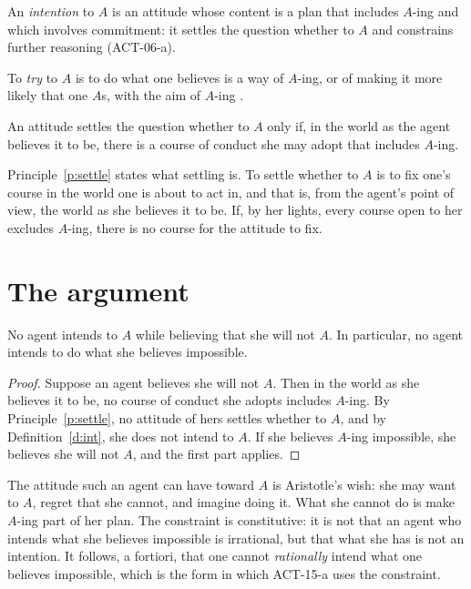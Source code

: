 \documentclass{situationist-preprint}
\begin{document}
\begin{definition}[Intention]\label{d:int}
An \emph{intention} to $A$ is an attitude whose content is a plan that includes $A$-ing and which involves commitment: it settles the question whether to $A$ and constrains further reasoning (ACT-06-a).
\end{definition}

\begin{definition}[Trying]\label{d:try}
To \emph{try} to $A$ is to do what one believes is a way of $A$-ing, or of making it more likely that one $A$s, with the aim of $A$-ing \citep{OShaughnessy1973,Hornsby1980}.
\end{definition}

\begin{principle}\label{p:settle}
An attitude settles the question whether to $A$ only if, in the world as the agent believes it to be, there is a course of conduct she may adopt that includes $A$-ing.
\end{principle}

Principle~\ref{p:settle} states what settling is. To settle whether to $A$ is to fix one's course in the world one is about to act in, and that is, from the agent's point of view, the world as she believes it to be. If, by her lights, every course open to her excludes $A$-ing, there is no course for the attitude to fix.

\section{The argument}

\begin{theorem}\label{t:main}
No agent intends to $A$ while believing that she will not $A$. In particular, no agent intends to do what she believes impossible.
\end{theorem}

\begin{proof}
Suppose an agent believes she will not $A$. Then in the world as she believes it to be, no course of conduct she adopts includes $A$-ing. By Principle~\ref{p:settle}, no attitude of hers settles whether to $A$, and by Definition~\ref{d:int}, she does not intend to $A$. If she believes $A$-ing impossible, she believes she will not $A$, and the first part applies.
\end{proof}

The attitude such an agent can have toward $A$ is Aristotle's wish: she may want to $A$, regret that she cannot, and imagine doing it. What she cannot do is make $A$-ing part of her plan. The constraint is constitutive: it is not that an agent who intends what she believes impossible is irrational, but that what she has is not an intention. It follows, a fortiori, that one cannot \emph{rationally} intend what one believes impossible, which is the form in which ACT-15-a uses the constraint.
\end{document}
